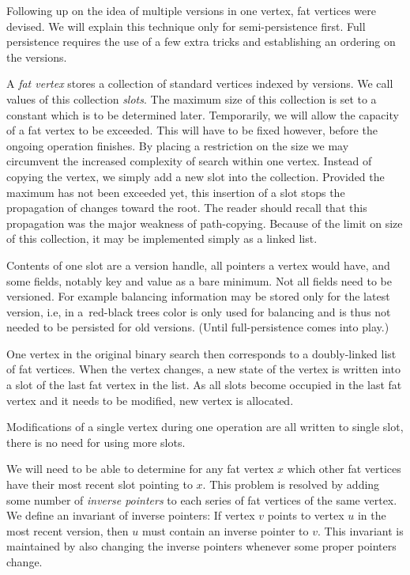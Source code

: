 Following up on the idea of multiple versions in one vertex, fat vertices were devised. 
We will explain this technique only for semi-persistence first. 
Full persistence requires the use of a few extra tricks and establishing an ordering on the versions.

A \emph{fat vertex} stores a collection of standard vertices indexed by versions. 
We call values of this collection \emph{slots}. 
The maximum size of this collection is set to a constant which is to be determined later. 
Temporarily, we will allow the capacity of a fat vertex to be exceeded. 
This will have to be fixed however, before the ongoing operation finishes.
By placing a restriction on the size we may circumvent the increased complexity of search within one vertex.
Instead of copying the vertex, we simply add a new slot into the collection. 
Provided the maximum has not been exceeded yet, this insertion of a slot stops the propagation of changes toward the root. 
The reader should recall that this propagation was the major weakness of path-copying.
Because of the limit on size of this collection, it may be implemented simply as a linked list.

Contents of one slot are a version handle, all pointers a vertex would have, and some fields, notably key and value as a bare minimum.
Not all fields need to be versioned. 
For example balancing information may be stored only for the latest version, i.e, in a~red-black trees color is only used for balancing and is thus not needed to be persisted for old versions. 
(Until full-persistence comes into play.)

One vertex in the original binary search then corresponds to a doubly-linked list of fat vertices.
When the vertex changes, a new state of the vertex is written into a slot of the last fat vertex in the list. 
As all slots become occupied in the last fat vertex and it needs to be modified, new vertex is allocated.

Modifications of a single vertex during one operation are all written to single slot, there is no need for using more slots.

We will need to be able to determine for any fat vertex $x$ which other fat vertices have their most recent slot pointing to $x$. 
This problem is resolved by adding some number of \emph{inverse pointers} to each series of fat vertices of the same vertex. 
We define an invariant of inverse pointers: If vertex $v$ points to vertex $u$ in the most recent version, then $u$ must contain an inverse pointer to $v$. This invariant is maintained by also changing the inverse pointers whenever some proper pointers change. 

